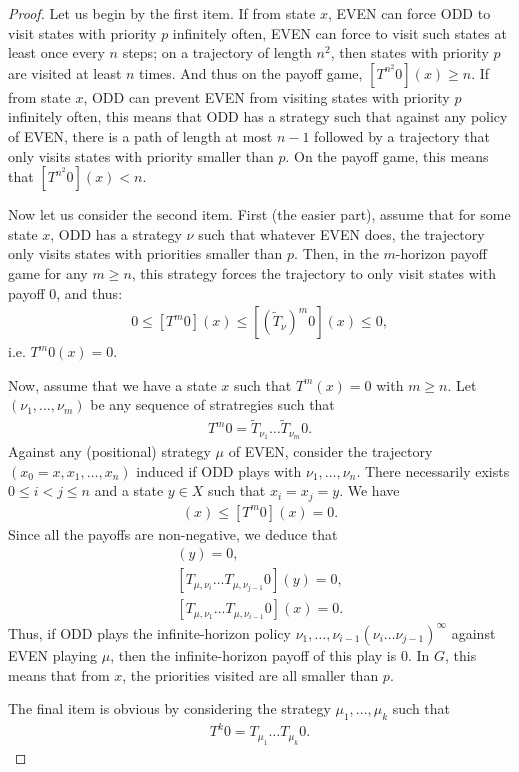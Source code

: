 \documentclass{article}
\begin{document}
\begin{proof}  
  Let us begin by the first item. If from state $x$, EVEN can force ODD to visit states with priority $p$ infinitely often, EVEN can force to visit such states at least once every $n$ steps; on a trajectory of length $n^2$, then states with priority $p$ are visited at least $n$ times. And thus on the payoff game, $[T^{n^2}0](x) \ge n$. If from state $x$, ODD can prevent EVEN from visiting states with priority $p$ infinitely often, this means that ODD has a strategy such that against any policy of EVEN, there is a path of length at most $n-1$ followed by a trajectory that only visits states with priority smaller than $p$. On the payoff game, this means that $[T^{n^2}0](x) < n$.

  Now let us consider the second item.
  First (the easier part), assume that for some state $x$, ODD has a strategy $\nu$ such that whatever EVEN does, the trajectory only visits states with priorities smaller than $p$. Then, in the $m$-horizon payoff game for any $m \ge n$, this strategy forces the trajectory to only visit states with payoff $0$, and thus:
  \begin{align}
   0 \le [T^m 0](x) \le [(\tilde T_{\nu})^m 0](x) \le 0,
  \end{align}
  i.e. $T^m 0(x)=0$.

  Now, assume that we have a state $x$ such that $T^m(x)=0$ with $m \ge n$. Let $(\nu_1,\dots,\nu_m)$ be any sequence of stratregies such that
  \begin{align}
  T^m 0 = \tilde T_{\nu_1} \dots \tilde T_{\nu_m} 0.
  \end{align}
  Against any (positional) strategy $\mu$ of EVEN, consider the trajectory $(x_0=x,x_1,\dots,x_n)$ induced if ODD plays with $\nu_1,\dots,\nu_n$. There necessarily exists $0 \le i<j\le n$ and a state $y \in X$ such that $x_i=x_j=y$. We have
  \begin{align}
    [T_{\mu,\nu_1} \dots T_{\mu,\nu_{i-1}} T_{\mu,\nu_i} \dots T_{\mu,\nu_{j-1}} T^{m-j}0](x) \le [T^m 0](x) = 0.
  \end{align}
  Since all the payoffs are non-negative, we deduce that
  \begin{align}
    [T^{m-j}0](y)=0, \\
    [T_{\mu,\nu_i} \dots T_{\mu,\nu_{j-1}} 0](y)=0, \\
    [T_{\mu,\nu_1} \dots T_{\mu,\nu_{i-1}} 0](x)=0.
  \end{align}
  Thus, if ODD plays the infinite-horizon policy $\nu_1,\dots,\nu_{i-1}(\nu_i \dots \nu_{j-1})^\infty$ against EVEN playing $\mu$, then the infinite-horizon payoff of this play is $0$. In $G$, this means that from $x$, the priorities visited are all smaller than $p$.

  The final item is obvious by considering the strategy $\mu_1,\dots,\mu_k$ such that
  \begin{align}
    T^k 0 = T_{\mu_1} \dots T_{\mu_k} 0.
  \end{align}
\end{proof}
\end{document}
